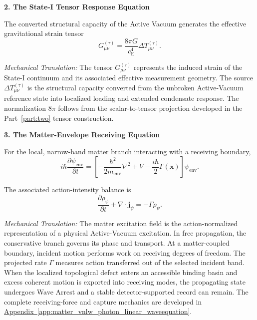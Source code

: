 \vspace{0.5em}
\noindent\textbf{2. The State-I Tensor Response Equation}

The converted structural capacity of the Active Vacuum generates the effective gravitational strain tensor
\begin{equation}
    G_{\mu\nu}^{(\tau)}
    =
    \frac{8\pi G}{c_{\mathrm E}^{4}}
    \Delta T_{\mu\nu}^{(\tau)}.
\end{equation}

\textit{Mechanical Translation:}
The tensor $G_{\mu\nu}^{(\tau)}$ represents the induced strain of the State-I continuum and its associated effective measurement geometry. The source $\Delta T_{\mu\nu}^{(\tau)}$ is the structural capacity converted from the unbroken Active-Vacuum reference state into localized loading and extended condensate response. The normalization $8\pi$ follows from the scalar-to-tensor projection developed in the Part~\ref{part:two} tensor construction.


\vspace{0.5em}
\noindent\textbf{3. The Matter-Envelope Receiving Equation}

For the local, narrow-band matter branch interacting with a receiving boundary,
\begin{equation}
    i\hbar
    \frac{\partial\psi_{\mathrm{env}}}{\partial t}
    =
    \left[
        -\frac{\hbar^2}{2m_{\mathrm{env}}}\nabla^2
        +
        V
        -
        \frac{i\hbar}{2}\Gamma(\mathbf{x})
    \right]
    \psi_{\mathrm{env}}.
\end{equation}

The associated action-intensity balance is
\begin{equation}
    \frac{\partial\rho_{\psi}}{\partial t}
    +
    \nabla\cdot\mathbf{j}_{\psi}
    =
    -\Gamma\rho_{\psi}.
\end{equation}

\textit{Mechanical Translation:}
The matter excitation field is the action-normalized representation of a physical Active-Vacuum excitation. In free propagation, the conservative branch governs its phase and transport. At a matter-coupled boundary, incident motion performs work on receiving degrees of freedom. The projected rate $\Gamma$ measures action transferred out of the selected incident band. When the localized topological defect enters an accessible binding basin and excess coherent motion is exported into receiving modes, the propagating state undergoes Wave Arrest and a stable detector-supported record can remain. The complete receiving-force and capture mechanics are developed in \hyperref[app:matter_vnlw_photon_linear_waveequation]{Appendix~\ref*{app:matter_vnlw_photon_linear_waveequation}}.


